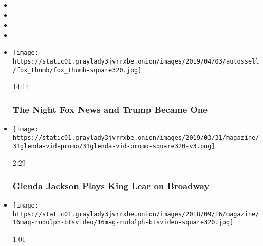 \begin{itemize}
\item
\item
\item
\item
\end{itemize}

\begin{itemize}
\item
  \href{https://www.nytimes3xbfgragh.onion/video/magazine/100000006349886/fox-news-trump-administration.html?action=click\&module=video-series-bar\&region=header\&pgtype=Article\&playlistId=video/magazine}{}

  \texttt{[image: https://static01.graylady3jvrrxbe.onion/images/2019/04/03/autossell/fox\_thumb/fox\_thumb-square320.jpg]}

  14:14

  \hypertarget{the-night-fox-news-and-trump-became-one}{%
  \subsubsection{The Night Fox News and Trump Became
  One}\label{the-night-fox-news-and-trump-became-one}}
\item
  \href{https://www.nytimes3xbfgragh.onion/video/magazine/100000006430808/glenda-jackson-plays-king-lear-on-broadway.html?action=click\&module=video-series-bar\&region=header\&pgtype=Article\&playlistId=video/magazine}{}

  \texttt{[image: https://static01.graylady3jvrrxbe.onion/images/2019/03/31/magazine/31glenda-vid-promo/31glenda-vid-promo-square320-v3.png]}

  2:29

  \hypertarget{glenda-jackson-plays-king-lear-on-broadway}{%
  \subsubsection{Glenda Jackson Plays King Lear on
  Broadway}\label{glenda-jackson-plays-king-lear-on-broadway}}
\item
  \href{https://www.nytimes3xbfgragh.onion/video/magazine/100000006104848/the-making-of-the-maya-rudolph-cover.html?action=click\&module=video-series-bar\&region=header\&pgtype=Article\&playlistId=video/magazine}{}

  \texttt{[image: https://static01.graylady3jvrrxbe.onion/images/2018/09/16/magazine/16mag-rudolph-btsvideo/16mag-rudolph-btsvideo-square320.jpg]}

  1:01


\end{itemize}
